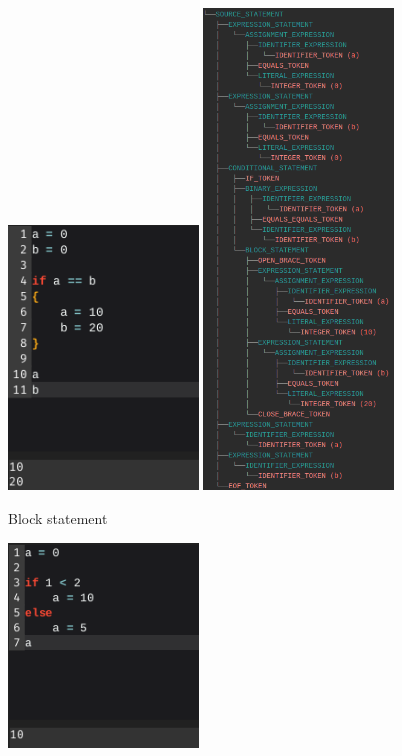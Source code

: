 \documentclass[
]{report}
\begin{document}
\begin{appendices}
\begin{figure}
		\includegraphics[width=0.45\textwidth]{block-code}
		\includegraphics[width=0.45\textwidth]{block-tree}
		\caption{Block statement}
		\label{fig:block-statement}
	\end{figure}
	\begin{figure}
		\centering
		\includegraphics[width=0.45\textwidth]{conditional-code}

\end{figure}
\end{appendices}
\end{document}

